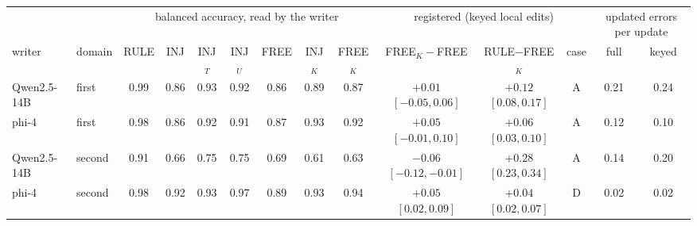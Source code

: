 \begin{tabular}{ll ccccccc cc c cc}
\toprule
 & & \multicolumn{7}{c}{balanced accuracy, read by the writer} & \multicolumn{3}{c}{registered (keyed local edits)} & \multicolumn{2}{c}{updated errors per update} \\
\cmidrule(lr){3-9}\cmidrule(lr){10-12}\cmidrule(lr){13-14}
writer & domain & RULE & INJ & INJ$_T$ & INJ$_U$ & FREE & INJ$_K$ & FREE$_K$ & FREE$_K-$FREE & RULE$-$FREE$_K$ & case & full & keyed \\
\midrule
Qwen2.5-14B & first & 0.99 & 0.86 & 0.93 & 0.92 & 0.86 & 0.89 & 0.87 & $+0.01$ $[-0.05,0.06]$ & $+0.12$ $[0.08,0.17]$ & A & 0.21 & 0.24 \\
phi-4 & first & 0.98 & 0.86 & 0.92 & 0.91 & 0.87 & 0.93 & 0.92 & $+0.05$ $[-0.01,0.10]$ & $+0.06$ $[0.03,0.10]$ & A & 0.12 & 0.10 \\
Qwen2.5-14B & second & 0.91 & 0.66 & 0.75 & 0.75 & 0.69 & 0.61 & 0.63 & $-0.06$ $[-0.12,-0.01]$ & $+0.28$ $[0.23,0.34]$ & A & 0.14 & 0.20 \\
phi-4 & second & 0.98 & 0.92 & 0.93 & 0.97 & 0.89 & 0.93 & 0.94 & $+0.05$ $[0.02,0.09]$ & $+0.04$ $[0.02,0.07]$ & D & 0.02 & 0.02 \\
\bottomrule
\end{tabular}
